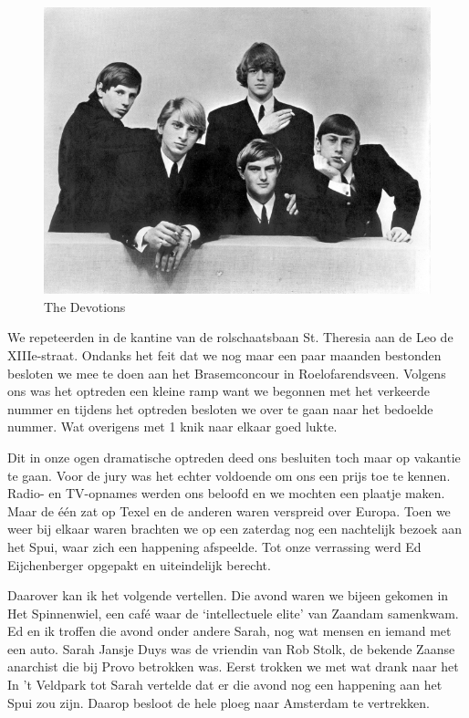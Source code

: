 \documentclass[10pt,twoside, openright]{memoir}
\begin{document}
\begin{figure}
\includegraphics[width=\textwidth]{img/ch27/promo3a}
\caption*{\footnotesize The Devotions}
\end{figure}

We repeteerden in de kantine van de rolschaatsbaan St. Theresia aan de Leo de XIIIe-straat. Ondanks het feit dat we nog maar een paar maanden bestonden besloten we mee te doen aan het Brasemconcour in Roelofarendsveen. Volgens ons was het optreden een kleine ramp want we begonnen met het verkeerde nummer en tijdens het optreden besloten we over te gaan naar het bedoelde nummer. Wat overigens met 1 knik naar elkaar goed lukte. 

Dit in onze ogen dramatische optreden deed ons besluiten toch maar op vakantie te gaan. Voor de jury was het echter voldoende om ons een prijs toe te kennen. Radio- en TV-opnames werden ons beloofd en we mochten een plaatje maken. Maar de één zat op Texel en de anderen waren verspreid over Europa. Toen we weer bij elkaar waren brachten we op een zaterdag nog een nachtelijk bezoek aan het Spui, waar zich een happening afspeelde. Tot onze verrassing werd Ed Eijchenberger opgepakt en uiteindelijk berecht.

Daarover kan ik het volgende vertellen. Die avond waren we bijeen gekomen in Het Spinnenwiel, een café waar de `intellectuele elite' van Zaandam samenkwam. Ed en ik troffen die avond onder andere Sarah, nog wat mensen en iemand met een auto. Sarah Jansje Duys was de vriendin van Rob Stolk, de bekende Zaanse anarchist die bij Provo betrokken was. Eerst trokken we met wat drank naar het In ’t Veldpark tot Sarah vertelde dat er die avond nog een happening aan het Spui zou zijn. Daarop besloot de hele ploeg naar Amsterdam te vertrekken. 
\end{document}
